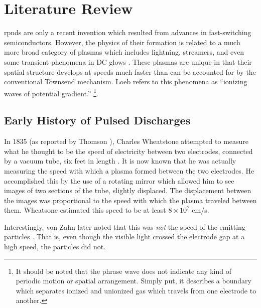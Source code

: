 \section{Literature Review}

\acs{rpnd}s are only a recent invention which resulted from advances in
fast-switching semiconductors. However, the physics of their formation is
related to a much more broad category of plasmas which includes lightning,
streamers, and even some transient phenomena in DC glows \cite{Loeb1965}. These
plasmas are unique in that their spatial structure develops at speeds much
faster than can be accounted for by the conventional Townsend mechanism. Loeb
refers to this phenomena as ``ionizing waves of potential gradient.'' \footnote{It should be noted that the phrase wave does not indicate
any kind of periodic motion or spatial arrangement. Simply put, it describes a
boundary which separates ionized and unionized gas which travels from one
electrode to another.}.

\subsection{Early History of Pulsed Discharges}

In 1835 (as reported by Thomson \cite{Thomson1893}), Charles Wheatstone
attempted to measure what he thought to be the speed of electricity between two
electrodes, connected by a vacuum tube, six feet in length
\cite{Wheatstone1835}. It is now known that he was actually measuring the speed
with which a plasma formed between the two electrodes. He accomplished this by
the use of a rotating mirror which allowed him to see images of two sections of
the tube, slightly displaced. The displacement between the images was
proportional to the speed with which the plasma traveled between them. Wheatsone
estimated this speed to be at least $8\times10^7$ cm/s.

Interestingly, von Zahn later noted that this was \emph{not} the speed of the
emitting particles \cite{Zahn1879}. That is, even though the visible light
crossed the electrode gap at a high speed, the particles did not.

